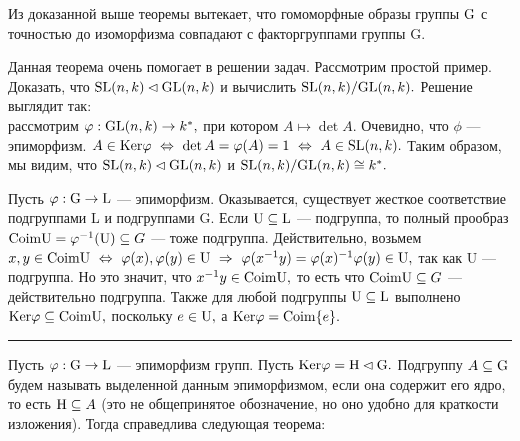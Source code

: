 Из доказанной выше теоремы вытекает, что гомоморфные образы группы ${\rm G}$ с точностью до изоморфизма совпадают с факторгруппами группы \rr G.

Данная теорема очень помогает в решении задач. Рассмотрим простой пример. Доказать, что ${\rm SL}(n, k)\lhd{\rm GL}(n, k)$ и вычислить ${\rm SL}(n, k)/{\rm GL}(n, k).$
Решение выглядит так:
\\рассмотрим $\varphi : {\rm GL}(n, k)\rightarrow k^*,$ при котором $A\mapsto \det A.$ Очевидно, что $\phi$ --- эпиморфизм. $A\in{\rm Ker}\varphi\ \Leftrightarrow\ \det A=\varphi(A)=1\ \Leftrightarrow\  A\in{\rm SL}(n, k).$
Таким образом, мы видим, что ${\rm SL}(n, k)\lhd{\rm GL}(n, k)$ и  ${\rm SL}(n, k)/{\rm GL}(n, k)\cong k^*.$

Пусть $\varphi : {\rm G}\rightarrow {\rm L}$ --- эпиморфизм. Оказывается, существует жесткое соответствие подгруппами \rr L и подгруппами \rr G. Если ${\rm U}\subseteq {\rm L}$ --- подгруппа, то
полный прообраз ${\rm Coim U}=\varphi^{-1}({\rm U})\subseteq G$ --- тоже подгруппа.
Действительно, возьмем $x, y\in {\rm Coim U}\ \Leftrightarrow\  \varphi(x), \varphi(y)\in{\rm U}\ \Rightarrow\  \varphi(x^{-1}y)=\varphi(x)^{-1}\varphi(y)\in{\rm U},$ так как \rr U --- подгруппа.
Но это значит, что $x^{-1}y\in {\rm Coim U},$ то есть что ${\rm Coim U}\subseteq G$ --- действительно подгруппа.
Также для любой подгруппы ${\rm U}\subseteq{\rm L}$ выполнено ${\rm Ker}\varphi\subseteq{\rm Coim U},$ поскольку $e\in {\rm U},$ а ${\rm Ker}\varphi={\rm Coim}\{e\}.$
\smallskip
\hrule
\rule{0pt}{10pt}

Пусть $\varphi : {\rm G}\rightarrow {\rm L}$ --- эпиморфизм групп. Пусть ${\rm Ker}\varphi={\rm H}\lhd {\rm G}.$ Подгруппу $A\subseteq{\rm G}$ будем называть выделенной
данным эпиморфизмом, если она содержит его ядро, то есть ${\rm H}\subseteq A$ (это не общепринятое обозначение, но оно удобно для краткости изложения). Тогда справедлива следующая теорема:

